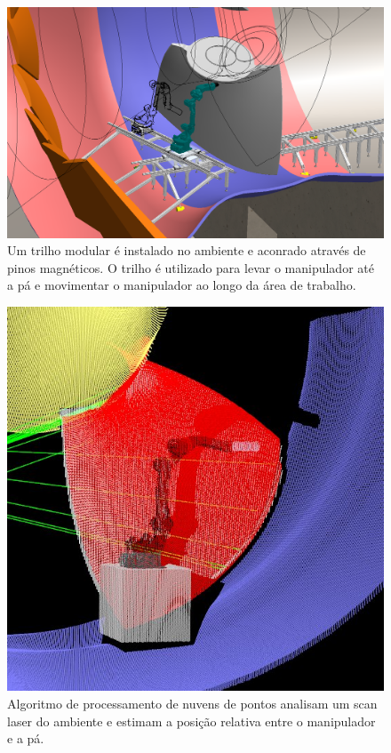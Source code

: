 \begin{figure}[H]
\centering
\includegraphics[width=0.9\columnwidth]{figs/EMMA_Base_Secundaria_01}
\caption{Um trilho modular é instalado no ambiente e aconrado através de pinos
magnéticos. O trilho é utilizado para levar o manipulador até a pá e movimentar
o manipulador ao longo da área de trabalho.}
\end{figure}

\begin{figure}[H]
\centering
\includegraphics[width=0.9\columnwidth]{figs/localizacao}
\caption{Algoritmo de processamento de nuvens de pontos analisam um scan laser
do ambiente e estimam a posição relativa entre o manipulador e a pá.}
\end{figure}

